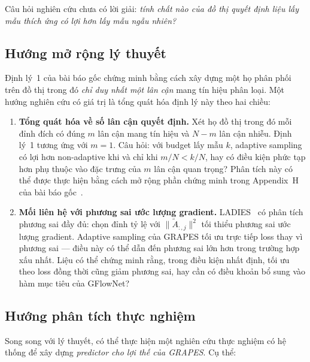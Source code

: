 Câu hỏi nghiên cứu chưa có lời giải: \textit{tính chất nào của đồ thị quyết định liệu lấy mẫu thích ứng có lợi hơn lấy mẫu ngẫu nhiên?}

\subsection{Hướng mở rộng lý thuyết}

Định lý~1 của bài báo gốc chứng minh bằng cách xây dựng một họ phân phối trên đồ thị trong đó \textit{chỉ duy nhất một lân cận} mang tín hiệu phân loại. Một hướng nghiên cứu có giá trị là tổng quát hóa định lý này theo hai chiều:

\begin{enumerate}
    \item \textbf{Tổng quát hóa về số lân cận quyết định.} Xét họ đồ thị trong đó mỗi đỉnh đích có đúng $m$ lân cận mang tín hiệu và $N-m$ lân cận nhiễu. Định lý~1 tương ứng với $m=1$. Câu hỏi: với budget lấy mẫu $k$, adaptive sampling có lợi hơn non-adaptive khi và chỉ khi $m/N < k/N$, hay có điều kiện phức tạp hơn phụ thuộc vào đặc trưng của $m$ lân cận quan trọng? Phân tích này có thể được thực hiện bằng cách mở rộng phần chứng minh trong Appendix~H của bài báo gốc~\cite{Younesian2023GRAPES}.

    \item \textbf{Mối liên hệ với phương sai ước lượng gradient.} LADIES~\cite{Zou2019LADIES} có phân tích phương sai đầy đủ: chọn đỉnh tỷ lệ với $\|\tilde{A}_{:,j}\|^2$ tối thiểu phương sai ước lượng gradient. Adaptive sampling của GRAPES tối ưu trực tiếp loss thay vì phương sai --- điều này có thể dẫn đến phương sai lớn hơn trong trường hợp xấu nhất. Liệu có thể chứng minh rằng, trong điều kiện nhất định, tối ưu theo loss đồng thời cũng giảm phương sai, hay cần có điều khoản bổ sung vào hàm mục tiêu của GFlowNet?
\end{enumerate}

\subsection{Hướng phân tích thực nghiệm}

Song song với lý thuyết, có thể thực hiện một nghiên cứu thực nghiệm có hệ thống để xây dựng \textit{predictor cho lợi thế của GRAPES}. Cụ thể:


